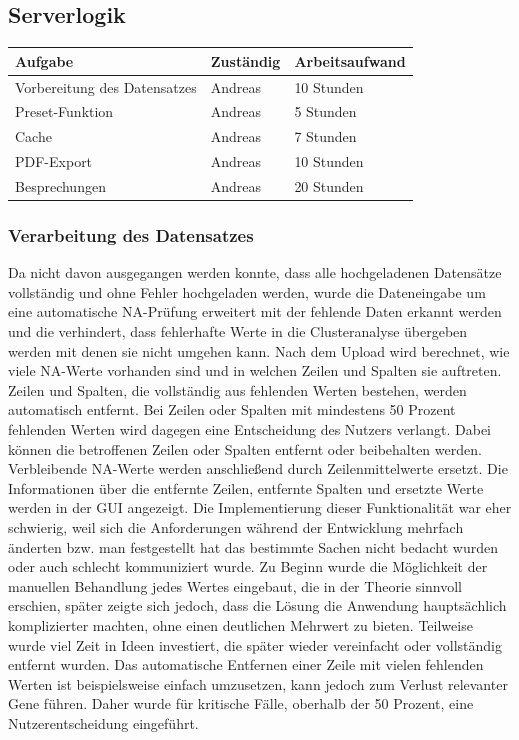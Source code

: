 \documentclass[12pt]{article}
\begin{document}
\newpage
\pagestyle{fancy}
\fancyhead{}

\subsection{Serverlogik}
\label{serverlogik}

\begin{table}[H]
	\centering
	\begin{tabular}{l|l|l}
		Aufgabe                       & Zuständig & Arbeitsaufwand \\ 
		\hline
		Vorbereitung des Datensatzes  & Andreas   & 10 Stunden     \\
		Preset-Funktion               & Andreas   & 5 Stunden      \\ 
		Cache                         & Andreas   & 7 Stunden      \\ 
		PDF-Export			          & Andreas   & 10 Stunden     \\
		Besprechungen 				  & Andreas   & 20 Stunden     \\
	\end{tabular}
\end{table}

\subsubsection{Verarbeitung des Datensatzes}
\label{Verarbeitung des Datensatzes}
Da nicht davon ausgegangen werden konnte, dass alle hochgeladenen Datensätze vollständig und ohne Fehler hochgeladen werden, wurde die Dateneingabe um eine automatische NA-Prüfung erweitert mit der fehlende Daten erkannt werden und die verhindert, dass fehlerhafte Werte in die Clusteranalyse übergeben werden mit denen sie nicht umgehen kann. Nach dem Upload wird berechnet, wie viele NA-Werte vorhanden sind und in welchen Zeilen und Spalten sie auftreten. Zeilen und Spalten, die vollständig aus fehlenden Werten bestehen, werden automatisch entfernt. Bei Zeilen oder Spalten mit mindestens 50 Prozent fehlenden Werten wird dagegen eine Entscheidung des Nutzers verlangt. Dabei können die betroffenen Zeilen oder Spalten entfernt oder beibehalten werden. Verbleibende NA-Werte werden anschließend durch Zeilenmittelwerte ersetzt. Die Informationen über die entfernte Zeilen, entfernte Spalten und ersetzte Werte werden in der GUI angezeigt. Die Implementierung dieser Funktionalität war eher schwierig, weil sich die Anforderungen während der Entwicklung mehrfach änderten bzw. man festgestellt hat das bestimmte Sachen nicht bedacht wurden oder auch schlecht kommuniziert wurde. Zu Beginn wurde die Möglichkeit der manuellen Behandlung jedes Wertes eingebaut, die in der Theorie sinnvoll erschien, später zeigte sich jedoch, dass die Lösung die Anwendung hauptsächlich komplizierter machten, ohne einen deutlichen Mehrwert zu bieten. Teilweise wurde viel Zeit in Ideen investiert, die später wieder vereinfacht oder vollständig entfernt wurden. Das automatische Entfernen einer Zeile mit vielen fehlenden Werten ist beispielsweise einfach umzusetzen, kann jedoch zum Verlust relevanter Gene führen. Daher wurde für kritische Fälle, oberhalb der 50 Prozent, eine Nutzerentscheidung eingeführt.
\end{document}
